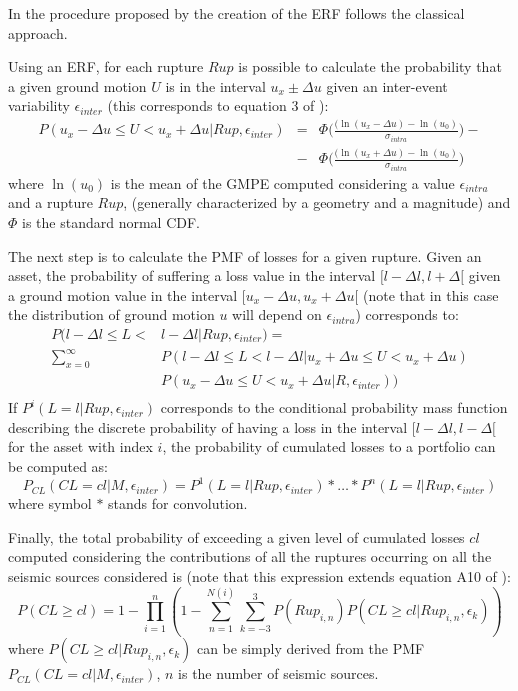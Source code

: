 %
In the procedure proposed by \cite{wesson2009} the creation of the ERF follows the 
classical approach.

Using an ERF, for each rupture $Rup$ is possible to calculate the 
probability that a given ground motion $U$ is in the interval $u_x\pm \Delta u$ 
given an inter-event variability $\epsilon_{inter}$ (this corresponds to 
equation 3 of \cite{wesson2009}): 
%
\begin{eqnarray}
P(u_x-\Delta u\leq U<u_x+\Delta u|Rup,\epsilon_{inter}) & = &  
	\Phi\bigg(\frac{(\ln (u_x-\Delta u)-\ln(u_0)}{\sigma_{intra}}\bigg) - \nonumber \\
	& - & \Phi\bigg(\frac{(\ln (u_x+\Delta u)-\ln(u_0)}{\sigma_{intra}}\bigg) 
\end{eqnarray}
where $\ln(u_0)$ is the mean of the GMPE computed considering a value 
$\epsilon_{intra}$ and a rupture $Rup$, (generally characterized by a geometry 
and a magnitude) and $\Phi$ is the standard normal CDF. 
  
The next step is to calculate the PMF of losses for a given rupture. Given an asset, 
the probability of suffering a loss value in the interval $[l-\Delta l, l+\Delta[$ 
given a ground motion value in the interval $[u_x-\Delta u,u_x+\Delta u[$ (note that in this 
case the distribution of ground motion $u$ will depend on $\epsilon_{intra}$) 
corresponds to:
%
\begin{equation}
\begin{array}{rl}
P(l-\Delta l\leq L < & l-\Delta l|Rup,\epsilon_{inter}) = \\
 	\sum\limits_{x=0}^{\infty}  
	& P(l-\Delta l\leq L < l-\Delta l|u_x+\Delta u\leq U<u_x+\Delta u) \\
	& P(u_x-\Delta u\leq U<u_x+\Delta u|R,\epsilon_{inter})) \\
\end{array}
\end{equation}
%
If $P^i(L=l|Rup,\epsilon_{inter})$ corresponds to the conditional probability mass
function describing the discrete probability of having a loss in the interval 
$[l-\Delta l, l-\Delta[$ for the asset with index $i$, the probability of cumulated 
losses to a portfolio can be computed as:
\begin{equation}
P_{CL}(CL=cl|M,\epsilon_{inter})=P^1(L=l|Rup,\epsilon_{inter})*\ldots*P^n(L=l|Rup,
	\epsilon_{inter})
\end{equation}
where symbol $*$ stands for convolution. 

Finally, the total probability of exceeding a given level of cumulated losses $cl$ 
computed considering the contributions of all the ruptures occurring on all the 
seismic sources considered is (note that this expression extends equation A10 of
\cite{field2003}):  
%
\begin{equation}
P(CL\geq cl)=1-\prod\limits_{i=1}^{n} 
	\left( 
		1-\sum\limits_{n=1}^{N(i)}
		\sum\limits_{k=-3}^{3}
			P(Rup_{i,n})P(CL\geq cl|Rup_{i,n},\epsilon_k)
	\right)
\end{equation}
where $P(CL\geq cl|Rup_{i,n},\epsilon_k)$ can be simply derived from the PMF 
$P_{CL}(CL=cl|M,\epsilon_{inter})$, $n$ is the number of seismic sources.
